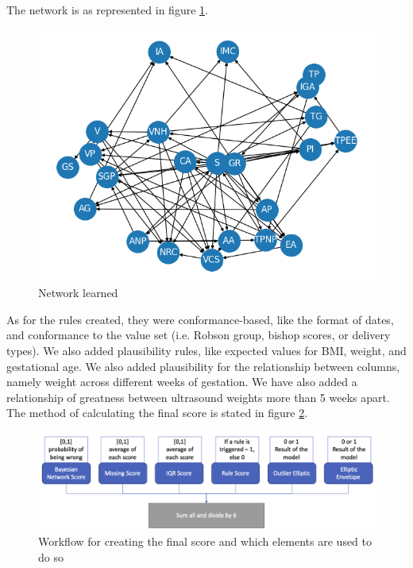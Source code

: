 The network is as represented in figure \ref{fig:network}.
\begin{figure}[htbp]
\centering
\caption{Network learned}\label{fig:network} 
\includegraphics[scale=0.68]{figures/network.png}
\end{figure}

As for the rules created, they were conformance-based, like the format of dates, and conformance to the value set (i.e. Robson group, bishop scores, or delivery types). We also added plausibility rules, like expected values for BMI, weight, and gestational age. We also added plausibility for the relationship between columns, namely weight across different weeks of gestation. We have also added a relationship of greatness between ultrasound weights more than 5 weeks apart. 
The method of calculating the final score is stated in figure \ref{fig:wf}.


\begin{figure}[htbp]
    \centering
    \caption{Workflow for creating the final score and which elements are used to do so}\label{fig:wf} 
    \includegraphics[scale=0.38]{figures/wf-update-dq.png}
    \end{figure}


